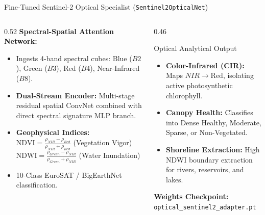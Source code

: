 \documentclass[aspectratio=169, 10pt]{beamer}
\begin{document}
\begin{frame}{Fine-Tuned Sentinel-2 Optical Specialist (\texttt{Sentinel2OpticalNet})}
  \vspace{-0.2em}
  \begin{columns}[T]
    \begin{column}{0.52\textwidth}
      \textbf{\color{IEEEDarkBlue}Spectral-Spatial Attention Network:}
      \begin{itemize}\setlength{\itemsep}{2.5pt}\small
        \item Ingests 4-band spectral cubes: Blue ($B2$), Green ($B3$), Red ($B4$), Near-Infrared ($B8$).
        \item \textbf{Dual-Stream Encoder:} Multi-stage residual spatial ConvNet combined with direct spectral signature MLP branch.
        \item \textbf{Geophysical Indices:}\\
          $\text{NDVI} = \frac{\rho_{NIR} - \rho_{Red}}{\rho_{NIR} + \rho_{Red}}$ \quad (Vegetation Vigor)\\
          $\text{NDWI} = \frac{\rho_{Green} - \rho_{NIR}}{\rho_{Green} + \rho_{NIR}}$ \quad (Water Inundation)
        \item 10-Class EuroSAT / BigEarthNet classification.
      \end{itemize}
    \end{column}

    \begin{column}{0.46\textwidth}
      \begin{exampleblock}{\small Optical Analytical Output}
        \scriptsize
        \begin{itemize}\setlength{\itemsep}{2pt}
          \item \textbf{Color-Infrared (CIR):} Maps $NIR \to \text{Red}$, isolating active photosynthetic chlorophyll.
          \item \textbf{Canopy Health:} Classifies into Dense Healthy, Moderate, Sparse, or Non-Vegetated.
          \item \textbf{Shoreline Extraction:} High NDWI boundary extraction for rivers, reservoirs, and lakes.
        \end{itemize}
      \end{exampleblock}
      \vspace{0.2em}
      \centering
      \scriptsize\color{IEEEDarkBlue}\textbf{Weights Checkpoint:} \texttt{optical\_sentinel2\_adapter.pt}
    \end{column}
  \end{columns}
\end{frame}
\end{document}
